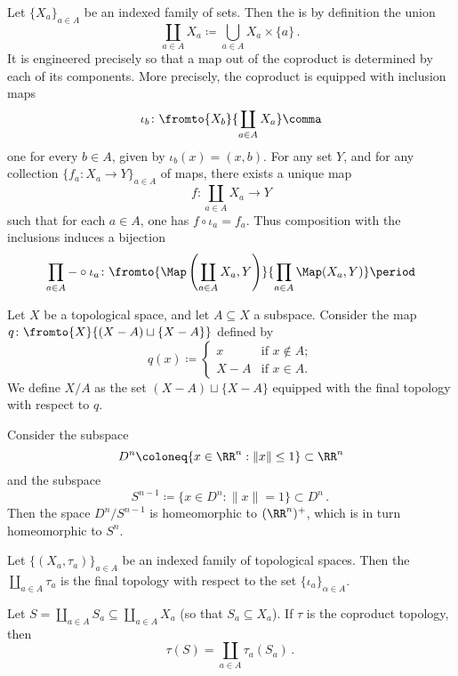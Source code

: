 \begin{nul}
	Let $\{X_a\}_{a\in A}$ be an indexed family of sets.
	Then the  is by definition the union
	\[
		\coprod_{a\in A}X_a\coloneq\bigcup_{a\in A}X_a\times\{a\} \period
	\]
	It is engineered precisely so that a map out of the coproduct is determined by each of its components.
	More precisely, the coproduct is equipped with inclusion maps
	\[
		\iota_b\colon\fromto{X_b}{\coprod_{a\in A}X_a} \comma
	\]
	one for every $b\in A$, given by $\iota_b(x)=(x,b)$.
	For any set $Y$, and for any collection $\{ f_a \colon X_a \to Y\}_{a\in A}$ of maps, there exists a unique map
	\[
		f \colon \coprod_{a \in A} X_a \to Y
	\]
	such that for each $a\in A$, one has $f \circ \iota_a = f_a$.
	Thus composition with the inclusions induces a bijection
	\[
		\prod_{a\in A}-\circ \iota_{a} \colon\fromto{\Map\left(\coprod_{a\in A}X_a,Y\right)}{\prod_{a\in A}\Map(X_a,Y)} \period
	\]
\end{nul}


\begin{dfn}
	Let $X$ be a topological space, and let $A\subseteq X$ a subspace.
	Consider the map $q\colon\fromto{X}{(X-A)\sqcup\{X-A\}}$ defined by
	\[
		q(x)\coloneq \begin{cases} x&\text{if }x\notin A;\\
			X-A&\text{if }x\in A.
		\end{cases}
	\]
	We define $X/A$ as the set $(X-A)\sqcup\{X-A\}$ equipped with the final topology with respect to $q$.
\end{dfn}

\begin{exm}
	Consider the subspace
	\[D^{n}\coloneq\{x\in\RR^{n} : \|x\|\leq 1\}\subset\RR^{n}\]
	and the subspace
	\[S^{n-1}\coloneq\{x\in D^{n} : \|x\|=1\}\subset D^{n} \period\]
	Then the space $D^n/S^{n-1}$ is homeomorphic to $(\RR^n)^+$, which is in turn homeomorphic to $S^n$.
\end{exm}

\begin{dfn}
	Let $\{(X_a,\tau_a)\}_{a\in A}$ be an indexed family of topological spaces.
	Then the  $\coprod_{a\in A}\tau_a$ is the final topology with respect to the set $\{\iota_a\}_{\alpha\in A}$.
\end{dfn}

\begin{nul}
	Let $S=\coprod_{a\in A}S_a\subseteq\coprod_{a\in A}X_a$ (so that $S_a\subseteq X_a$).
	If $\tau$ is the coproduct topology, then
	\[
		\tau(S)=\coprod_{a\in A}\tau_a(S_a) \period
	\]
\end{nul}

